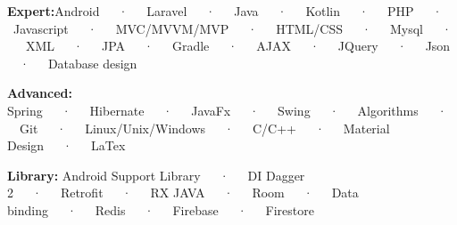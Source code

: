 \vspace{-1.0em}%
\vspace{-1.5em}%
\begin{cventries}
  \cventry
    {}
    {}
    {}
    {}
    {
      \begin{cvitems}
        \item{\textbf{Expert:}\space\space Android~~~·~~~Laravel~~~·~~~Java~~~·~~~Kotlin~~~·~~~PHP~~~·~~~Javascript~~~·~~~MVC/MVVM/MVP~~~·~~~HTML/CSS~~~·~~~Mysql~~~·~~~XML~~~·~~~JPA~~~·~~~Gradle~~~·~~~AJAX~~~·~~~JQuery~~~·~~~Json~~~·~~~Database design}
\item{\textbf{Advanced:}\space\space
Spring~~~·~~~Hibernate~~~·~~~JavaFx~~~·~~~Swing~~~·~~~Algorithms~~~·~~~Git~~~·~~~Linux/Unix/Windows~~~·~~~C/C++~~~·~~~Material Design~~~·~~~LaTex
}
\item{\textbf{Library:}\space\space
Android Support Library~~~·~~~DI Dagger 2~~~·~~~Retrofit~~~·~~~RX JAVA~~~·~~~Room~~~·~~~Data binding~~~·~~~Redis~~~·~~~Firebase~~~·~~~Firestore}
      \end{cvitems}
    }
  
\end{cventries}

\vspace{-1.0em}%
